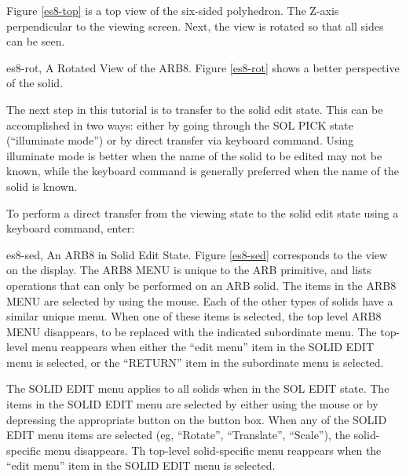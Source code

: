 Figure \ref{es8-top} 
is a top view of the six-sided polyhedron.
The Z-axis perpendicular to the viewing screen.
Next, the view is rotated so that all sides can be seen.


\mfig es8-rot, A Rotated View of the ARB8.
Figure \ref{es8-rot} shows a better perspective of the solid.

The next step in this tutorial is to transfer to the solid edit state.
This can be accomplished in two ways:  either by going through
the SOL PICK state (``illuminate mode'') or by direct transfer via
keyboard command.
Using illuminate mode is better when the name of the solid to be
edited may not be known, while the keyboard command is generally
preferred when the name of the solid is known.


To perform a direct transfer from the viewing state to the solid edit state
using a keyboard command, enter:


\mfig es8-sed, An ARB8 in Solid Edit State.
Figure \ref{es8-sed} corresponds to the view on the display.
The ARB8 MENU is unique to the ARB primitive,
and lists operations that can only be performed on an ARB solid.
The items in the ARB8 MENU are
selected by using the mouse.
Each of the other types of solids have a
similar unique menu.
When one of these items is selected, the top level ARB8 MENU disappears,
to be replaced with the indicated subordinate menu.
The top-level menu reappears when either
the ``edit menu'' item in the SOLID EDIT menu is selected,
or the ``RETURN'' item in the subordinate menu is selected.

The  SOLID EDIT  menu applies to all
solids when in the SOL EDIT state.
The items in the  SOLID EDIT  menu are selected
by either using the mouse or by depressing the appropriate button on the
button box.
When any of the SOLID EDIT menu items are selected
(eg, ``Rotate'', ``Translate'', ``Scale''), the solid-specific menu
disappears.
Th top-level solid-specific menu reappears when
the ``edit menu'' item in the SOLID EDIT menu is selected.

